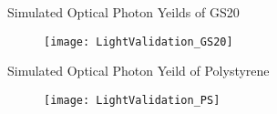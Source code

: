 \begin{frame}{Simulated Optical Photon Yeilds of GS20}
  \begin{figure}
    \centering
    \texttt{[image: LightValidation\_GS20]}
  \end{figure}
\end{frame}
\begin{frame}{Simulated Optical Photon Yeild of Polystyrene}
  \begin{figure}
    \centering
    \texttt{[image: LightValidation\_PS]}
  \end{figure}
  \vspace{2.5cm}
\end{frame}

